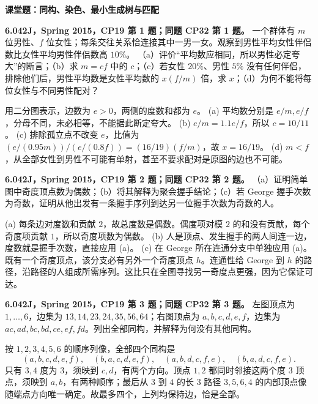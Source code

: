 \par\addvspace{7pt}\noindent\textbf{课堂题：同构、染色、最小生成树与匹配}\par
\begin{exercise}\label{mit:6042-cp19-q1}\label{mit:6042-cp32-q1}
\textbf{6.042J，Spring 2015，CP19 第 1 题；同题 CP32 第 1 题。}
一个群体有 $m$ 位男性、$f$ 位女性；每条交往关系恰连接其中一男一女。观察到男性平均女性伴侣数比女性平均男性伴侣数高 $10\%$。
（a）评价“平均数应相同，所以男性必定夸大”的断言；（b）求 $m=cf$ 中的 $c$；（c）若女性 $20\%$、男性 $5\%$ 没有任何伴侣，排除他们后，男性平均数是女性平均数的 $x(f/m)$ 倍，求 $x$；（d）为何不能将每位女性与不同男性配对？
\end{exercise}
\begin{solution}
用二分图表示，边数为 $e>0$，两侧的度数和都为 $e$。
(a) 平均数分别是 $e/m,e/f$，分母不同，未必相等，不能据此断定夸大。
(b) $e/m=1.1e/f$，所以 $c=10/11$。
(c) 排除孤立点不改变 $e$，比值为 $(e/(0.95m))/(e/(0.8f))=(16/19)(f/m)$，故 $x=16/19$。
(d) $m<f$，从全部女性到男性不可能有单射，甚至不要求配对是原图的边也不可能。
\end{solution}

\begin{exercise}\label{mit:6042-cp19-q2}\label{mit:6042-cp32-q2}
\textbf{6.042J，Spring 2015，CP19 第 2 题；同题 CP32 第 2 题。}
（a）证明简单图中奇度顶点数为偶数；（b）将其解释为聚会握手结论；（c）若 George 握手次数为奇数，证明从他出发有一条握手序列到达另一位握手次数为奇数的人。
\end{exercise}
\begin{solution}
(a) 每条边对度数和贡献 $2$，故总度数是偶数。偶度项对模 $2$ 的和没有贡献，每个奇度项贡献 $1$，所以奇度项数为偶数。
(b) 人是顶点、发生握手的两人间连一边，度数就是握手次数，直接应用 (a)。
(c) 在 George 所在连通分支中单独应用 (a)。既有一个奇度顶点，该分支必有另外一个奇度顶点 $h$。连通性给 George 到 $h$ 的路径，沿路径的人组成所需序列。这比只在全图寻找另一奇度点更强，因为它保证可达。
\end{solution}

\begin{exercise}\label{mit:6042-cp19-q3}\label{mit:6042-cp32-q3}
\textbf{6.042J，Spring 2015，CP19 第 3 题；同题 CP32 第 3 题。}
左图顶点为 $1,\ldots,6$，边集为 $13,14,23,24,35,56,64$；右图顶点为 $a,b,c,d,e,f$，边集为 $ac,ad,bc,bd,ce,ef,fd$。列出全部同构，并解释为何没有其他同构。
\end{exercise}
\begin{solution}
按 $1,2,3,4,5,6$ 的顺序列像，全部四个同构是
\[
(a,b,c,d,e,f),\quad(b,a,c,d,e,f),\quad
(a,b,d,c,f,e),\quad(b,a,d,c,f,e).
\]
只有 $3,4$ 度为 $3$，须映到 $c,d$，有两个方向。顶点 $1,2$ 都同时邻接这两个度 $3$ 顶点，须映到 $a,b$，有两种顺序；最后从 $3$ 到 $4$ 的长 $3$ 路径 $3,5,6,4$ 的内部顶点像随端点方向唯一确定。故最多四个，上列均保持边，恰是全部。
\end{solution}

